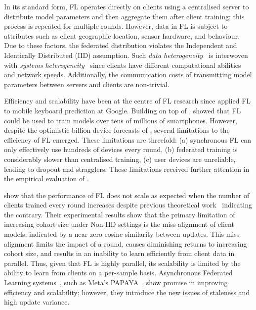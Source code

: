 In its standard form, FL operates directly on clients using a centralised server to distribute model parameters and then aggregate them after client training; this process is repeated for multiple rounds. However, data in FL is subject to attributes such as client geographic location, sensor hardware, and behaviour. Due to these factors, the federated distribution violates the Independent and Identically Distributed (IID) assumption. Such \emph{data heterogeneity}~\citep[sec. 3.1]{AdvancedAndOpenProblems} is interwoven with \emph{systems heterogeneity}~\citep[sec. 7.2]{AdvancedAndOpenProblems} since clients have different computational abilities and network speeds. Additionally, the communication costs of transmitting model parameters between servers and clients are non-trivial.

Efficiency and scalability have been at the centre of FL research since \citet{GoogleKeyboard} applied FL to mobile keyboard prediction at Google. Building on top of \citet{GoogleKeyboard}, \citet{ScaleSystemDesign} showed that FL could be used to train models over tens of millions of smartphones. However, despite the optimistic billion-device forecasts of \citet{ScaleSystemDesign}, several limitations to the efficiency of FL emerged. These limitations are threefold: (a) synchronous FL can only effectively use hundreds of devices every round, (b) federated training is considerably slower than centralised training, (c) user devices are unreliable, leading to dropout and stragglers. These limitations received further attention in the empirical evaluation of \citet{LargeCohorts}.

\citet{LargeCohorts} show that the performance of FL does not scale as expected when the number of clients trained every round increases despite previous theoretical work~\citep{TighterTheory} indicating the contrary. Their experimental results show that the primary limitation of increasing cohort size under Non-IID settings is the miss-alignment of client models, indicated by a near-zero cosine similarity between updates. This miss-alignment limits the impact of a round, causes diminishing returns to increasing cohort size, and results in an inability to learn efficiently from client data in parallel. Thus, given that FL is highly parallel, its scalability is limited by the ability to learn from clients on a per-sample basis. Asynchronous Federated Learning systems~\citep{AsynchronousFLonHetDevicesSurvey,FedBuff,AsyncrhonousOnlineFL,AsyncDropout}, such as Meta's PAPAYA~\citep{PAPAYA}, show promise in improving efficiency and scalability; however, they introduce the new issues of staleness and high update variance.

